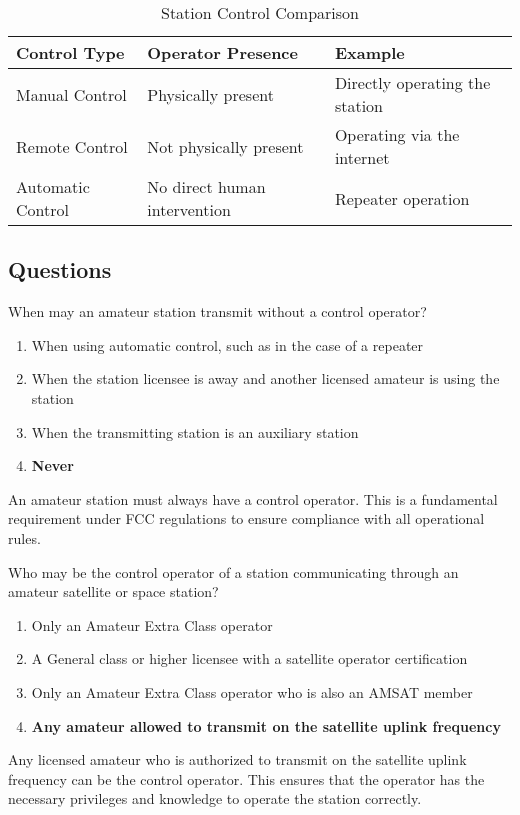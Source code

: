 \begin{table}[htbp]
    \centering
    \caption{Station Control Comparison}
    \label{tab:control_types}
    \begin{tabular}{|l|l|l|}
        \hline
        \textbf{Control Type} & \textbf{Operator Presence} & \textbf{Example} \\
        \hline
        Manual Control & Physically present & Directly operating the station \\
        Remote Control & Not physically present & Operating via the internet \\
        Automatic Control & No direct human intervention & Repeater operation \\
        \hline
    \end{tabular}
\end{table}

\subsection*{Questions}
\begin{tcolorbox}[colback=gray!10!white,colframe=black!75!black,title={T1E01}]
    When may an amateur station transmit without a control operator?
    \begin{enumerate}[label=\Alph*),noitemsep]
        \item When using automatic control, such as in the case of a repeater
        \item When the station licensee is away and another licensed amateur is using the station
        \item When the transmitting station is an auxiliary station
        \item \textbf{Never}
    \end{enumerate}
\end{tcolorbox}
An amateur station must always have a control operator. This is a fundamental requirement under FCC regulations to ensure compliance with all operational rules.


\begin{tcolorbox}[colback=gray!10!white,colframe=black!75!black,title={T1E02}]
    Who may be the control operator of a station communicating through an amateur satellite or space station?
    \begin{enumerate}[label=\Alph*),noitemsep]
        \item Only an Amateur Extra Class operator
        \item A General class or higher licensee with a satellite operator certification
        \item Only an Amateur Extra Class operator who is also an AMSAT member
        \item \textbf{Any amateur allowed to transmit on the satellite uplink frequency}
    \end{enumerate}
\end{tcolorbox}
Any licensed amateur who is authorized to transmit on the satellite uplink frequency can be the control operator. This ensures that the operator has the necessary privileges and knowledge to operate the station correctly.

